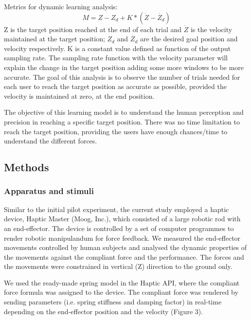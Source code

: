 Metrics for dynamic learning analysis:
%
\begin{equation}
  M=Z-Z_d +K* (\dot{Z}-\dot{Z_d})
\end{equation}
%
Z is the target position reached at the end of each trial and $\dot{Z} $ is the velocity maintained at the target position; $Z_d$  and $\dot{Z_d }$  are the desired goal position and velocity respectively. K is a constant value defined as function of the output sampling rate. The sampling rate function with the velocity parameter will explain the change in the target position adding some more windows to be more accurate.  The goal of this analysis is to observe the number of trials needed for each user to reach the target position as accurate as possible, provided the velocity is maintained at zero, at the end position.
	
The objective of this learning model is to understand the human perception and precision in reaching a specific target position. There was no time limitation to reach the target position, providing the users have enough chances/time to understand the different forces. 

\subsection{Methods}

\subsubsection{Apparatus and stimuli}
Similar to the initial pilot experiment, the current study employed a haptic device, Haptic Master (Moog, Inc.), which consisted of a large robotic rod with an end-effector. The device is controlled by a set of computer programmes to render robotic manipulandum for force feedback. We measured the end-effector movements controlled by human subjects and analysed the dynamic properties of the movements against the compliant force and the performance. The forces and the movements were constrained in vertical (Z) direction to the ground only.

We used the ready-made spring model in the Haptic API, where the compliant force formula was assigned to the device. The compliant force was rendered by sending parameters (i.e. spring stiffness and damping factor) in real-time depending on the end-effector position and the velocity (Figure 3).

